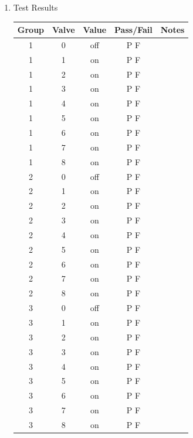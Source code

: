 \documentclass{article}
\begin{document}
\begin{enumerate}
\pagebreak
\item Test Results \\
	\vspace{1em}
	\begin{tabular}{|c|c|c|c|c|}
		\hline
		Group & Valve & Value & Pass/Fail & Notes \\
		\hline
		1 & 0 & off & P \quad F & \hspace{20em} \\
		\hline
		1 & 1 & on & P \quad F & \\
		\hline
		1 & 2 & on & P \quad F & \\
		\hline
		1 & 3 & on & P \quad F & \\
		\hline
		1 & 4 & on & P \quad F & \\
		\hline
		1 & 5 & on & P \quad F & \\
		\hline
		1 & 6 & on & P \quad F & \\
		\hline
		1 & 7 & on & P \quad F & \\
		\hline
		1 & 8 & on & P \quad F & \\
		\hline
		\hline
		2 & 0 & off & P \quad F & \\
		\hline
		2 & 1 & on & P \quad F & \\
		\hline
		2 & 2 & on & P \quad F & \\
		\hline
		2 & 3 & on & P \quad F & \\
		\hline
		2 & 4 & on & P \quad F & \\
		\hline
		2 & 5 & on & P \quad F & \\
		\hline
		2 & 6 & on & P \quad F & \\
		\hline
		2 & 7 & on & P \quad F & \\
		\hline
		2 & 8 & on & P \quad F & \\
		\hline
		\hline
		3 & 0 & off & P \quad F & \\
		\hline
		3 & 1 & on & P \quad F & \\
		\hline
		3 & 2 & on & P \quad F & \\
		\hline
		3 & 3 & on & P \quad F & \\
		\hline
		3 & 4 & on & P \quad F & \\
		\hline
		3 & 5 & on & P \quad F & \\
		\hline
		3 & 6 & on & P \quad F & \\
		\hline
		3 & 7 & on & P \quad F & \\
		\hline
		3 & 8 & on & P \quad F & \\
		\hline
	\end{tabular}
\end{enumerate}
\end{document}
